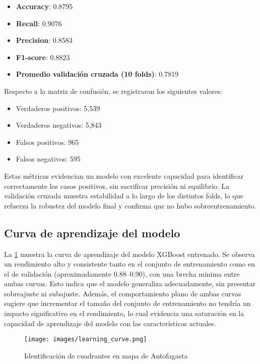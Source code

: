 \documentclass[12pt]{article}
\begin{document}
\begin{itemize}
    \item \textbf{Accuracy}: 0.8795
    \item \textbf{Recall}: 0.9076
    \item \textbf{Precision}: 0.8583
    \item \textbf{F1-score}: 0.8823
    \item \textbf{Promedio validación cruzada (10 folds)}: 0.7819
\end{itemize}

\noindent Respecto a la matriz de confusión, se registraron los siguientes valores:

\begin{itemize}
    \item Verdaderos positivos: 5,539
    \item Verdaderos negativos: 5,843
    \item Falsos positivos: 965
    \item Falsos negativos: 595
\end{itemize}

Estas métricas evidencian un modelo con excelente capacidad para identificar correctamente los casos positivos, sin sacrificar precisión ni equilibrio. La validación cruzada muestra estabilidad a lo largo de los distintos folds, lo que refuerza la robustez del modelo final y confirma que no hubo sobreentrenamiento.

\subsection{Curva de aprendizaje del modelo}

La \cref{fig:learning_curve} muestra la curva de aprendizaje del modelo XGBoost entrenado. Se observa un rendimiento alto y consistente tanto en el conjunto de entrenamiento como en el de validación (aproximadamente 0.88–0.90), con una brecha mínima entre ambas curvas. Esto indica que el modelo generaliza adecuadamente, sin presentar sobreajuste ni subajuste. Además, el comportamiento plano de ambas curvas sugiere que incrementar el tamaño del conjunto de entrenamiento no tendría un impacto significativo en el rendimiento, lo cual evidencia una saturación en la capacidad de aprendizaje del modelo con las características actuales.


\begin{figure}[H]
    \centering
    \texttt{[image: images/learning\_curve.png]}
    \caption{Identificación de cuadrantes en mapa de Antofagasta}
    \label{fig:learning_curve}
\end{figure}
\end{document}
